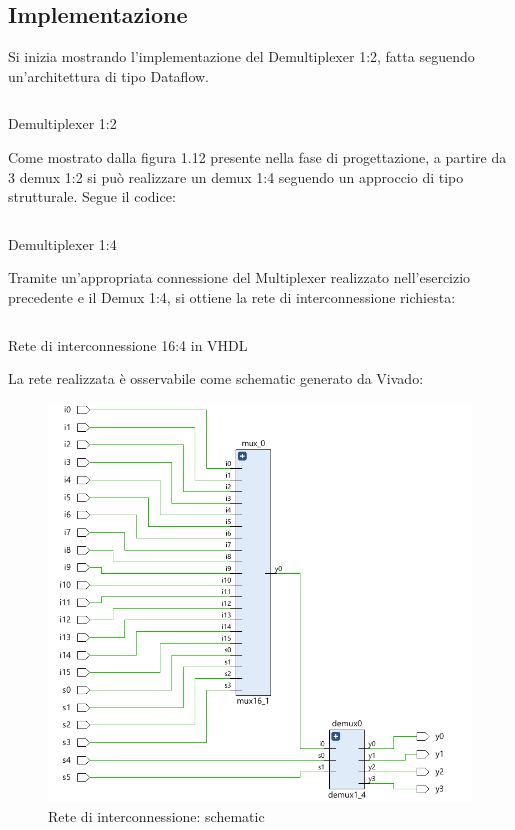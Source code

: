 \subsection{Implementazione}
Si inizia mostrando l'implementazione del Demultiplexer 1:2, fatta seguendo un'architettura di tipo Dataflow.
\begin{code}
    \inputminted[frame=lines, framesep=2mm, baselinestretch=1.2, bgcolor=LightGray, fontsize=\footnotesize, linenos]{vhdl}{vhdl_files/demux1_2.vhd}
    \caption{Demultiplexer 1:2}
    \label{lst: demux_1_2}
\end{code}
Come mostrato dalla figura 1.12 presente nella fase di progettazione, a partire da 3 demux 1:2 si può realizzare un demux 1:4 seguendo un approccio di tipo strutturale. Segue il codice:
\begin{code}
    \inputminted[frame=lines, framesep=2mm, baselinestretch=1.2, bgcolor=LightGray, fontsize=\footnotesize, linenos]{vhdl}{vhdl_files/demux1_4.vhd}
    \caption{Demultiplexer 1:4}
    \label{lst: demux_1_4}
\end{code}
Tramite un'appropriata connessione del Multiplexer realizzato nell'esercizio precedente e il Demux 1:4, si ottiene la rete di interconnessione richiesta:
\begin{code}
    \inputminted[frame=lines, framesep=2mm, baselinestretch=1.2, bgcolor=LightGray, fontsize=\footnotesize, linenos]{vhdl}{vhdl_files/interc16_4.vhd}
    \caption{Rete di interconnessione 16:4 in VHDL}
    \label{lst: R_int16_4}
\end{code}
La rete realizzata è osservabile come schematic generato da Vivado:
\begin{figure}[H]
	\centering
	\includegraphics[width=1\textwidth]{img/reteIntVivado}
	\caption{Rete di interconnessione: schematic}
	\label{R_int_schem} 
\end{figure}

